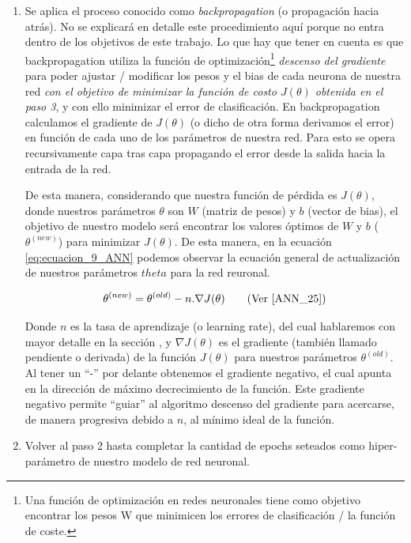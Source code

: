 \documentclass[12pt,a4paper]{article}
\begin{document}
\begin{sloppypar}
\begin{enumerate}
\item Se aplica el proceso conocido como \textit{backpropagation} (o propagación hacia atrás). No se explicará en detalle este procedimiento aquí porque no entra dentro de los objetivos de este trabajo. Lo que hay que tener en cuenta es que backpropagation utiliza la función de optimización\footnote{Una función de optimización en redes neuronales tiene como objetivo encontrar los pesos W que minimicen los errores de clasificación / la función de coste.} \textit{descenso del gradiente} para poder ajustar / modificar los pesos y el bias de cada neurona de nuestra red \textit{con el objetivo de minimizar la función de costo $J(\theta)$ obtenida en el paso 3}, y con ello minimizar el error de clasificación. En backpropagation calculamos el gradiente de $J(\theta)$ (o dicho de otra forma derivamos el error) en función de cada uno de los parámetros de nuestra red. Para esto se opera recursivamente capa tras capa propagando el error desde la salida hacia la entrada de la red.

De esta manera, considerando que nuestra función de pérdida es $J(\theta)$, donde nuestros parámetros $\theta$ son $W$ (matriz de pesos) y $b$ (vector de bias), el objetivo de nuestro modelo será encontrar los valores óptimos de $W$ y $b$ ($\theta^{(new)}$) para minimizar $J(\theta)$. De esta manera, en la ecuación \ref{eq:ecuacion_9_ANN} podemos observar la ecuación general de actualización de nuestros parámetros $theta$ para la red reuronal.
 
\begin{equation}\label{eq:ecuacion_9_ANN}
\theta^{(new)} = \theta^{(old)} - n . \nabla J(\theta)   \qquad \text{(Ver \cite{ANN_25})}
\end{equation}

Donde $n$ es la tasa de aprendizaje (o learning rate), del cual hablaremos con mayor detalle en la sección \textit{}, y $\nabla J(\theta)$ es el gradiente (también llamado pendiente o derivada) de la función $J(\theta)$ para nuestros parámetros $\theta^{(old)}$. Al tener un “-” por delante obtenemos el gradiente negativo, el cual apunta en la dirección de máximo decrecimiento de la función. Este gradiente negativo permite “guiar” al algoritmo descenso del gradiente para acercarse, de manera progresiva debido a $n$, al mínimo ideal de la función.      

\item Volver al paso 2 hasta completar la cantidad de epochs seteados como hiper-parámetro de nuestro modelo de red neuronal. 


\end{enumerate}
\end{sloppypar}
\end{document}
